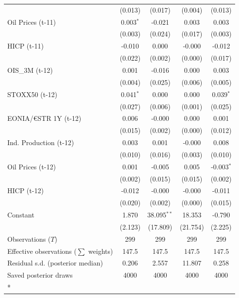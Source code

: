 \begin{longtable}[t]{lcccc}
 & (0.013) & (0.017) & (0.004) & (0.013)\\
Oil Prices (t-11) & 0.003$^{*}$ & -0.021 & 0.003 & 0.003\\
 & (0.003) & (0.024) & (0.017) & (0.003)\\
HICP (t-11) & -0.010 & 0.000 & -0.000 & -0.012\\
 & (0.022) & (0.002) & (0.000) & (0.017)\\
OIS\_3M (t-12) & 0.001 & -0.016 & 0.000 & 0.003\\
 & (0.004) & (0.025) & (0.006) & (0.005)\\
STOXX50 (t-12) & 0.041$^{*}$ & 0.000 & 0.000 & 0.039$^{*}$\\
 & (0.027) & (0.006) & (0.001) & (0.025)\\
EONIA/€STR 1Y (t-12) & 0.006 & -0.000 & 0.000 & 0.001\\
 & (0.015) & (0.002) & (0.000) & (0.012)\\
Ind. Production (t-12) & 0.003 & 0.001 & -0.000 & 0.008\\
 & (0.010) & (0.016) & (0.003) & (0.010)\\
Oil Prices (t-12) & 0.001 & -0.005 & 0.005 & -0.003$^{*}$\\
 & (0.002) & (0.015) & (0.015) & (0.002)\\
HICP (t-12) & -0.012 & -0.000 & -0.000 & -0.011\\
 & (0.020) & (0.002) & (0.000) & (0.015)\\
Constant & 1.870 & 38.095$^{**}$ & 18.353 & -0.790\\
 & (2.123) & (17.809) & (21.754) & (2.225)\\
\midrule
Observations ($T$) & 299 & 299 & 299 & 299\\
Effective observations ($\sum$ weights) & 147.5 & 147.5 & 147.5 & 147.5\\
Residual s.d. (posterior median) & 0.206 & 2.557 & 11.807 & 0.258\\
Saved posterior draws & 4000 & 4000 & 4000 & 4000\\*
\end{longtable}
\endgroup{}

